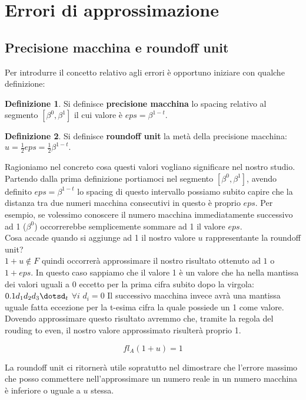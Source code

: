 \documentclass[12pt, a4paper]{book}
\theoremstyle{definition}
\newtheorem{defn}{Definizione}[section]
\begin{document}
\section{Errori di approssimazione}

\subsection{Precisione macchina e roundoff unit}
\begin{flushleft}
Per introdurre il concetto relativo agli errori è opportuno iniziare con qualche definizione:
\begin{defn}
Si definisce \textbf{precisione macchina} lo spacing relativo al segmento $[\beta^0, \beta^1]$ il cui valore è $eps = \beta^{1-t}.$
\end{defn}
\begin{defn}
Si definisce  \textbf{roundoff unit} la metà della precisione macchina: $u = \frac{1}{2}eps =  \frac{1}{2}\beta^{1-t}.$
\end{defn}

Ragioniamo nel concreto cosa questi valori vogliano significare nel nostro studio.\\
Partendo dalla prima definizione portiamoci nel segmento $[\beta^0, \beta^1]$, avendo definito $eps = \beta^{1-t}$ lo spacing di questo intervallo possiamo subito capire che la distanza tra due numeri macchina consecutivi in questo è proprio $eps$.
Per esempio,  se volessimo conoscere il numero macchina immediatamente successivo ad 1 ($\beta^{0}$) occorrerebbe semplicemente sommare ad 1 il valore $eps$. \\
Cosa accade quando si aggiunge ad 1 il nostro valore $u$ rappresentante la roundoff unit? \\
$ 1 + u \notin F$ quindi occorrerà approssimare il nostro risultato ottenuto ad $1$ o $1+eps$.  In questo caso sappiamo che il valore 1 è un valore che ha nella mantissa dei valori uguali a 0 eccetto per la prima cifra subito dopo la virgola: $0.1d_{1}d_{2}d_{3}\dotsd_{t}$ $\forall i $ $d_{i} = 0$
Il successivo macchina invece avrà una mantissa uguale fatta eccezione per la t-esima cifra la quale possiede un 1 come valore.  Dovendo approssimare questo risultato avremmo che, tramite la regola del rouding to even, il nostro valore approssimato risulterà proprio 1. 

\[ fl_{A}(1+u) = 1  \]

La roundoff unit ci ritornerà utile sopratutto nel dimostrare che l'errore massimo che posso commettere nell'approssimare un numero reale in un numero macchina è inferiore o uguale a $u$ stessa. 
\end{flushleft}
\end{document}
